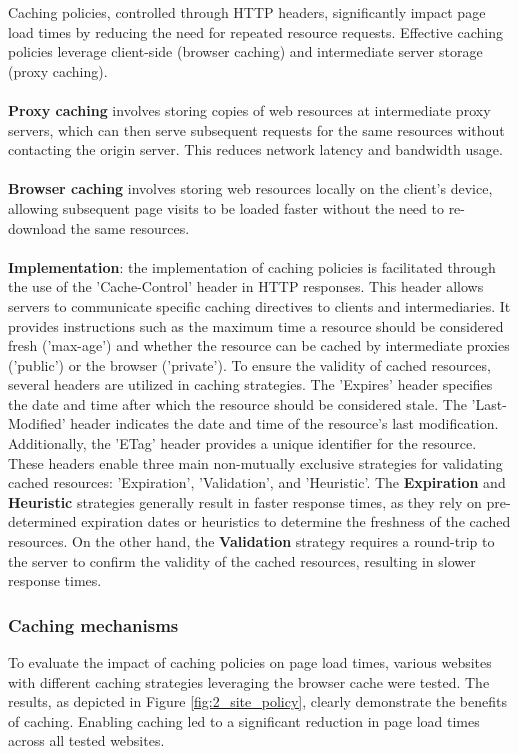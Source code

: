 Caching policies, controlled through HTTP headers, significantly impact page load times by reducing the need for repeated 
resource requests. Effective caching policies leverage client-side (browser caching) and intermediate server storage 
(proxy caching). \\
\\
\textbf{Proxy caching} involves storing copies of web resources at intermediate proxy servers, which can then serve subsequent requests 
for the same resources without contacting the origin server. This reduces network latency and bandwidth usage.\\
\\
\textbf{Browser caching} involves storing web resources locally on the client's device, allowing subsequent page visits to be loaded 
faster without the need to re-download the same resources.\\
\\
\textbf{Implementation}: the implementation of caching policies is facilitated through the use of the 'Cache-Control' header in HTTP responses. 
This header allows servers to communicate specific caching directives to clients and intermediaries. It provides instructions such as the maximum 
time a resource should be considered fresh ('max-age') and whether the resource can be cached by intermediate proxies ('public') or the browser ('private').
To ensure the validity of cached resources, several headers are utilized in caching strategies. The 'Expires' header specifies the date and time after which 
the resource should be considered stale. The 'Last-Modified' header indicates the date and time of the resource's last modification. Additionally, 
the 'ETag' header provides a unique identifier for the resource. These headers enable three main non-mutually exclusive strategies for validating 
cached resources: 'Expiration', 'Validation', and 'Heuristic'. The \textbf{Expiration} and \textbf{Heuristic} strategies generally result in faster response times, 
as they rely on pre-determined expiration dates or heuristics to determine the freshness of the cached resources. On the other hand, 
the \textbf{Validation} strategy requires a round-trip to the server to confirm the validity of the cached resources, resulting in slower response times.

\subsubsection{Caching mechanisms}
To evaluate the impact of caching policies on page load times, various websites with different caching strategies leveraging the browser cache were tested. 
The results, as depicted in Figure \ref{fig:2_site_policy}, clearly demonstrate the benefits of caching. Enabling caching led to a significant reduction 
in page load times across all tested websites. 

